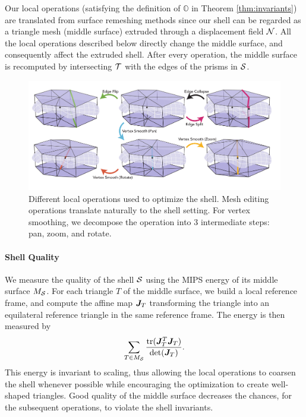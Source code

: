 Our local operations (satisfying the definition of $\mathbb{O}$ in Theorem \ref{thm:invariants}) are translated from surface remeshing methods \cite{dunyach2013adaptive} since our shell can be regarded as a triangle mesh (middle surface) extruded through a displacement field $\N$. All the local operations described below directly change the middle surface, and consequently affect the extruded shell. After every operation, the middle surface is recomputed by intersecting $\T$ with the edges of the prisms in $\S$.
\begin{figure}
    \centering
    \includegraphics[width=0.9\linewidth]{prism-tex/figs/local-operations}
    \caption{Different local operations used to optimize the shell. Mesh editing operations translate naturally to the shell setting. For vertex smoothing, we decompose the operation into 3 intermediate steps: pan, zoom, and rotate.}
    \label{prism:fig:local_operations}
    
\end{figure}

\paragraph{Shell Quality}
We measure the quality of the shell $\S$ using the MIPS energy \cite{hormann2000mips} of its middle surface $M_\S$. For each triangle $T$ of the middle surface, we build a local reference frame, and  compute the affine map $\J_T$ transforming the triangle into an equilateral reference triangle in the same reference frame. The energy is then measured by
\begin{equation*}
    \sum_{T \in M_\S} \frac{\tr(\J_T^T\J_T)}{\det(\J_T)}.
\end{equation*}
This energy is invariant to scaling, thus allowing the local operations to coarsen the shell whenever possible while  encouraging the optimization to create well-shaped triangles. Good quality of the middle surface decreases the chances, for the subsequent operations, to violate the shell invariants.

